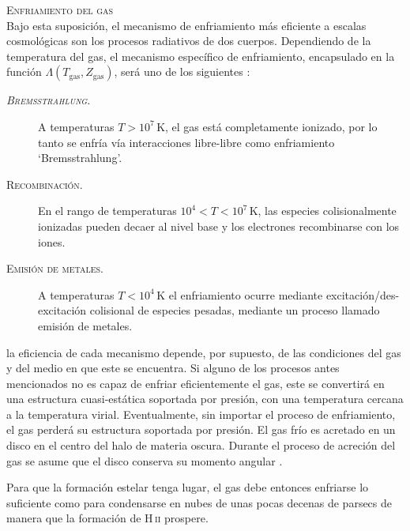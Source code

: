 \documentclass[xcolor=dvipsnames,4pt,hyperref={colorlinks,citecolor=black,linkcolor=black,urlcolor=black}]{beamer}
\begin{document}
\begin{frame}[allowframebreaks]{\textsc{Enfriamiento del gas}}
$$$$
%
Bajo esta suposición, el mecanismo de enfriamiento más eficiente a escalas cosmológicas son los
procesos radiativos de dos cuerpos. Dependiendo de la temperatura del gas, el mecanismo específico
de enfriamiento, encapsulado en la función $\Lambda(T_\text{gas}, Z_\text{gas})$, será uno de los
siguientes \citep{Somerville2014}:
%
\begin{description}
%
\item[\textsc{\emph{Bremsstrahlung}.}] A temperaturas $T>10^7\,$K, el gas está completamente
ionizado, por lo tanto se enfría vía interacciones libre-libre como enfriamiento `Bremsstrahlung'.
\item[\textsc{Recombinación.}] En el rango de temperaturas $10^4<T<10^7\,$K, las especies
colisionalmente ionizadas pueden decaer al nivel base y los electrones recombinarse con los iones.
\item[\textsc{Emisión de metales.}] A temperaturas $T<10^4\,$K el enfriamiento ocurre mediante
excitación/des-excitación colisional de especies pesadas, mediante un proceso llamado emisión de
metales.
\end{description}
%
la eficiencia de cada mecanismo depende, por supuesto, de las condiciones del gas y del medio en que
este se encuentra. Si alguno de los procesos antes mencionados no es capaz de enfriar eficientemente
el gas, este se convertirá en una estructura cuasi-estática soportada por presión, con una
temperatura cercana a la temperatura virial. Eventualmente, sin importar el proceso de enfriamiento,
el gas perderá su estructura soportada por presión.
El gas frío es acretado en un disco en el centro del halo de materia oscura.
Durante el proceso de acreción del gas se asume que el disco conserva su momento angular
\citep[véase][]{White1991, Cole2000}.

Para que la formación estelar tenga lugar, el gas debe entonces enfriarse lo suficiente como para
condensarse en nubes de unas pocas decenas de parsecs de manera que la formación de H\,\textsc{ii}
prospere.
%
\end{frame}
\end{document}
